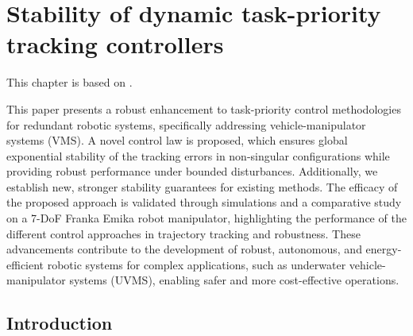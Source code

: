 \documentclass[../main.tex]{subfiles}
\begin{document}
\chapter{Stability of dynamic task-priority tracking controllers}
This chapter is based on \cite{wrzos-kaminska2025}.

This paper presents a robust enhancement to task-priority control methodologies for redundant robotic systems, specifically addressing vehicle-manipulator systems (VMS). A novel control law is proposed, which ensures global exponential 
stability of the tracking errors in non-singular configurations while providing robust performance under bounded disturbances. Additionally, we establish new, stronger stability guarantees for existing methods. The efficacy of the proposed approach is validated through simulations and a comparative study on a 7-DoF Franka Emika robot manipulator, highlighting the performance of the different control approaches in trajectory tracking and robustness. These advancements contribute to the development of robust, autonomous, and energy-efficient robotic systems for complex applications, such as underwater vehicle-manipulator systems (UVMS), enabling safer and more cost-effective operations.

\section{Introduction}\label{sec:comp:intro}
%
\end{document}
